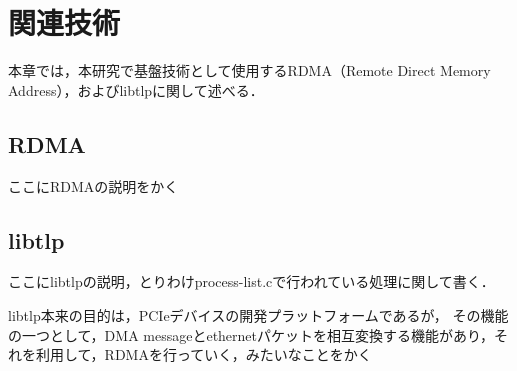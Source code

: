 \chapter{関連技術}
\label{chap:related_works}

本章では，本研究で基盤技術として使用するRDMA（Remote Direct Memory Address），およびlibtlpに関して述べる．

\section{RDMA}

ここにRDMAの説明をかく

\section{libtlp}

ここにlibtlpの説明，とりわけprocess-list.cで行われている処理に関して書く．

libtlp本来の目的は，PCIeデバイスの開発プラットフォームであるが，
その機能の一つとして，DMA messageとethernetパケットを相互変換する機能があり，それを利用して，RDMAを行っていく，みたいなことをかく
